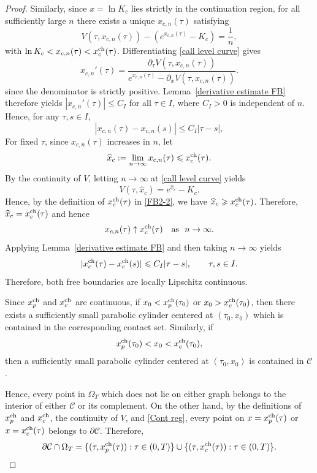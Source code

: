 \documentclass[11pt, a4paper, leqno]{amsart}
\numberwithin{equation}{section}
\theoremstyle{plain}
\theoremstyle{definition}
\theoremstyle{remark}
\def\leq{\leqslant}
\def\geq{\geqslant}
\begin{document}
{\begin{proof}
Similarly, since $x=\ln K_c$ lies strictly in the continuation
region, for all sufficiently large $n$ there exists a unique
$x_{c,n}(\tau)$ satisfying
\begin{equation}\label{call level curve}
    V(\tau,x_{c,n}(\tau))
    -(e^{x_{c,n}(\tau)}-K_c)
    =\frac1n,
\end{equation}
with
$\ln K_c<x_{c,n}(\tau)<x_c^{\rm ch}(\tau)$.
Differentiating \eqref{call level curve} gives
\[
    x_{c,n}'(\tau)
    =
    \frac{\partial_\tau V(\tau,x_{c,n}(\tau))}
    {e^{x_{c,n}(\tau)}
     -\partial_xV(\tau,x_{c,n}(\tau))}.
\]
since the denominator is strictly positive.
Lemma~\ref{derivative estimate FB} therefore yields
$|x_{c,n}'(\tau)|\leq C_I$ for all $\tau\in I$, where
$C_I>0$ is independent of $n$.
Hence, for any $\tau,s\in I$,
\[
    |x_{c,n}(\tau)-x_{c,n}(s)|
    \leq C_I|\tau-s|,
\]
{
For fixed $\tau$, since $x_{c,n}(\tau)$ increases in $n$, let
\[
    \widehat x_c:=\lim_{n\to\infty}x_{c,n}(\tau)
    \leq x_c^{\rm ch}(\tau).
\]
By the continuity of $V$, letting $n\to\infty$ at \eqref{call level curve} yields
\[
    V(\tau,\widehat x_c)=e^{\widehat x_c}-K_c.
\]
Hence, by the definition of $x_c^{\rm ch}(\tau)$ in
\eqref{FB2-2}, we have $\widehat x_c\geq x_c^{\rm ch}(\tau)$.
Therefore, $\widehat x_c= x_c^{\rm ch}(\tau)$ and hence
\[
    x_{c,n}(\tau)\uparrow x_c^{\rm ch}(\tau)
    \quad \text{as }\ n\to \infty.
\]
} Applying Lemma~\ref{derivative estimate FB} and then taking
$n\to\infty$ yields
\[
    |x_c^{\rm ch}(\tau)-x_c^{\rm ch}(s)|
    \leq C_I|\tau-s|,
    \qquad \tau,s\in I.
\]
Therefore, both free boundaries are locally Lipschitz continuous.

Since $x_p^{\rm ch}$ and $x_c^{\rm ch}$ are continuous, if
$x_0<x_p^{\rm ch}(\tau_0)$ or
$x_0>x_c^{\rm ch}(\tau_0)$, then there exists a sufficiently small
parabolic cylinder centered at $(\tau_0,x_0)$ which is contained in
the corresponding contact set. Similarly, if
\[
    x_p^{\rm ch}(\tau_0)<x_0<x_c^{\rm ch}(\tau_0),
\]
then a sufficiently small parabolic cylinder centered at
$(\tau_0,x_0)$ is contained in $\mathcal C$.

Hence, every point in $\Omega_T$ which does not lie on either graph
belongs to the interior of either $\mathcal C$ or its complement.
{
On the other hand, by the definitions of $x_p^{\rm ch}$ and
$x_c^{\rm ch}$, the continuity of $V$, and \eqref{Cont reg},
every point on
$x=x_p^{\rm ch}(\tau)$ or $x=x_c^{\rm ch}(\tau)$
belongs to $\partial\mathcal C$.}
Therefore,
\[
    \partial\mathcal C\cap\Omega_T
    =
    \{(\tau,x_p^{\rm ch}(\tau)):\tau\in(0,T)\}
    \cup
    \{(\tau,x_c^{\rm ch}(\tau)):\tau\in(0,T)\}.
\]
\end{proof}

}
\end{document}
